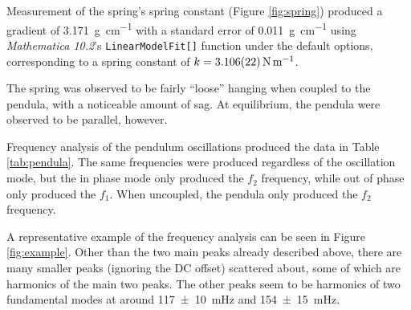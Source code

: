 \documentclass[a4paper]{scrartcl}
\begin{document}
Measurement of the spring's spring constant (Figure \ref{fig:spring}) produced a gradient of \SI{3.171}{\gram\per\centi\metre} with a standard error of \SI{0.011}{\gram\per\centi\metre} using \emph{Mathematica 10.2}'s \texttt{LinearModelFit[]} function under the default options, corresponding to a spring constant of \(k = \SI{3.106 \pm 0.022}{\newton\per\metre}\).

The spring was observed to be fairly ``loose'' hanging when coupled to the pendula, with a noticeable amount of sag. At equilibrium, the pendula were observed to be parallel, however.

Frequency analysis of the pendulum oscillations produced the data in Table \ref{tab:pendula}. The same frequencies were produced regardless of the oscillation mode, but the in phase mode only produced the \(f_2\) frequency, while out of phase only produced the \(f_1\). When uncoupled, the pendula only produced the \(f_2\) frequency.

A representative example of the frequency analysis can be seen in Figure \ref{fig:example}. Other than the two main peaks already described above, there are many smaller peaks (ignoring the DC offset) scattered about, some of which are harmonics of the main two peaks. The other peaks seem to be harmonics of two fundamental modes at around \SI{117 \pm 10}{\milli\hertz} and \SI{154 \pm 15}{\milli\hertz}.
\end{document}

